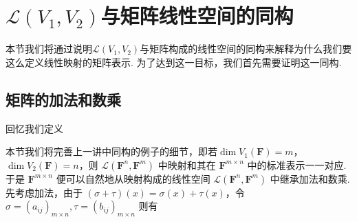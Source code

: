 \section{$\mathcal{L}(V_1,V_2)$与矩阵线性空间的同构}

本节我们将通过说明$\mathcal{L}(V_1,V_2)$与矩阵构成的线性空间的同构来解释为什么我们要这么定义线性映射的矩阵表示. 为了达到这一目标，我们首先需要证明这一同构.

\subsection{矩阵的加法和数乘}

回忆我们定义

本节我们将完善上一讲中同构的例子的细节，即若$\dim V_1(\mathbf{F})=m$，$\dim V_2(\mathbf{F})=n$，则 $\mathcal{L}(\mathbf{F}^n, \mathbf{F}^m)$ 中映射和其在 $\mathbf{F}^{m\times n}$ 中的标准表示一一对应. 于是 $\mathbf{F}^{m\times n}$ 便可以自然地从映射构成的线性空间 $\mathcal{L}(\mathbf{F}^n, \mathbf{F}^m)$ 中继承加法和数乘. 先考虑加法，由于 $(\sigma+\tau)(x) = \sigma(x) + \tau(x)$，令 $\sigma = (a_{ij})_{m\times n}, \tau = (b_{ij})_{m\times n}$ 则有

